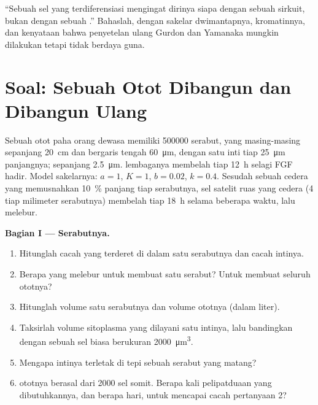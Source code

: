 \begin{exercise}[$\star\star\star$]\label{exo:b2:cell-differentiation:12}
``Sebuah sel yang terdiferensiasi mengingat dirinya siapa dengan sebuah
sirkuit, bukan dengan sebuah .'' Bahaslah, dengan sakelar
dwimantapnya, kromatinnya, dan kenyataan bahwa penyetelan ulang Gurdon
dan Yamanaka mungkin dilakukan tetapi tidak berdaya guna.
\end{exercise}

\section{Soal: Sebuah Otot Dibangun dan Dibangun Ulang}

\begin{problem}
\label{pb:b2:cell-differentiation:1}
Sebuah otot paha orang dewasa memiliki \num{500000} serabut, yang
masing-masing sepanjang \qty{20}{cm} dan bergaris tengah
\qty{60}{\micro m}, dengan satu inti tiap \qty{25}{\micro m}
panjangnya;  sepanjang \qty{2.5}{\micro m}. 
lembaganya membelah tiap \qty{12}{h} selagi FGF hadir. Model
sakelarnya: $a = 1$, $K = 1$, $b = 0.02$, $k
= 0.4$. Sesudah sebuah
cedera yang memusnahkan \qty{10}{\%} panjang tiap serabutnya, sel
satelit ruas yang cedera (\num{4} tiap milimeter serabutnya) membelah
tiap \qty{18}{h} selama beberapa waktu, lalu melebur.

\medskip
\noindent\textbf{Bagian I --- Serabutnya.}
\begin{enumerate}
  \item Hitunglah cacah  yang terderet di dalam satu serabutnya
        dan cacah intinya.
  \item Berapa  yang melebur untuk membuat satu serabut? Untuk
        membuat seluruh ototnya?
  \item Hitunglah volume satu serabutnya dan volume ototnya (dalam
        liter).
  \item Taksirlah volume sitoplasma yang dilayani satu intinya, lalu
        bandingkan dengan sebuah sel biasa berukuran \qty{2000}{\micro m^3}.
  \item Mengapa intinya terletak di tepi sebuah serabut yang matang?
  \item {} ototnya berasal dari \num{2000} sel somit. Berapa kali
        pelipatduaan yang dibutuhkannya, dan berapa hari, untuk mencapai
        cacah pertanyaan 2?
\end{enumerate}


\end{problem}
